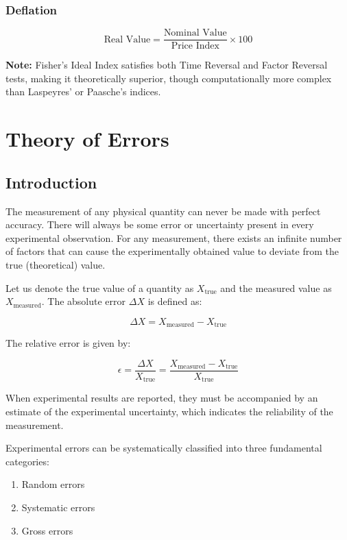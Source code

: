 \documentclass[twoside]{book}
\begin{document}
\subsection{Deflation}
\begin{equation}
\text{Real Value} = \frac{\text{Nominal Value}}{\text{Price Index}} \times 100
\end{equation}

\vspace{1cm}

\textbf{Note:} Fisher's Ideal Index satisfies both Time Reversal and Factor Reversal tests, making it theoretically superior, though computationally more complex than Laspeyres' or Paasche's indices.


\chapter{Theory of Errors}

\section{Introduction}

The measurement of any physical quantity can never be made with perfect accuracy. There will always be some error or uncertainty present in every experimental observation. For any measurement, there exists an infinite number of factors that can cause the experimentally obtained value to deviate from the true (theoretical) value.

Let us denote the true value of a quantity as $X_{\text{true}}$ and the measured value as $X_{\text{measured}}$. The absolute error $\Delta X$ is defined as:

\begin{equation*}
\Delta X = X_{\text{measured}} - X_{\text{true}}
\end{equation*}

The relative error is given by:

\begin{equation*}
\epsilon = \frac{\Delta X}{X_{\text{true}}} = \frac{X_{\text{measured}} - X_{\text{true}}}{X_{\text{true}}}
\end{equation*}

When experimental results are reported, they must be accompanied by an estimate of the experimental uncertainty, which indicates the reliability of the measurement.

Experimental errors can be systematically classified into three fundamental categories:
\begin{enumerate}
\item Random errors
\item Systematic errors
\item Gross errors
\end{enumerate}
\end{document}
